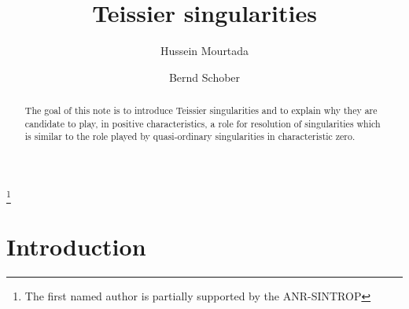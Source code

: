 \documentclass[11pt, a4paper]{amsart}
\numberwithin{equation}{section}
\theoremstyle{plain}
\theoremstyle{definition}
\theoremstyle{remark}
\newcommand{\0}{{\boldsymbol 0}}
\begin{document}
	
	\thispagestyle{empty}
	
	
	
	\title{Teissier singularities}
	
	
	
	\author{Hussein Mourtada}
	\thanks{The first named author is partially supported by the ANR-SINTROP
		}
	\address{
		Hussein Mourtada\\
		Universit\'e Paris Cité and Sorbonne Universit\'e, CNRS, IMJ-PRG, F-75013 Paris, France.}
	
	
	\author{Bernd Schober}
	\address{Bernd Schober\\
	None (Hamburg, Germany)}
	
	
	
	
	\begin{abstract}
	The goal of this note is to introduce Teissier singularities and to explain why they are candidate to play, in positive characteristics, a role for resolution of singularities  which is similar to the role played by quasi-ordinary singularities in characteristic zero. 
	\end{abstract}
	
	
	\maketitle
	
	
	\section{Introduction}
	\label{Intro}
	
	
\end{document}
